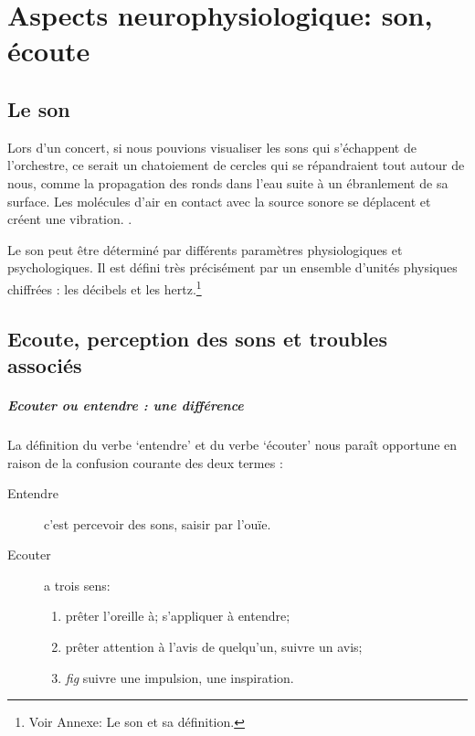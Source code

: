 
\chapter{Aspects neurophysiologique: son, écoute}


\section{Le son}

Lors d'un concert, si nous pouvions visualiser les sons qui
s'échappent de l'orchestre, ce serait un chatoiement de cercles qui se
répandraient tout autour de nous, comme 
la propagation des
ronds dans l'eau suite à un ébranlement de sa surface.
Les molécules d'air en contact avec la source sonore se déplacent et
créent une vibration. \autocite[p. 183]{bencivelli:pourquoi,}.


Le son peut être déterminé par différents paramètres
physiologiques et psychologiques.
Il est défini très précisément par un ensemble d'unités physiques chiffrées
: les décibels  et les hertz.\footnote{Voir Annexe: Le son et sa
  définition.}




\section{Ecoute, perception des sons et troubles associés}
\paragraph{Ecouter ou entendre : une différence}

La définition du verbe `entendre' et du verbe `écouter' 
\autocite[pp. 361--385]{hachette:dictionnaire} nous paraît opportune
en raison de la confusion courante des deux termes :
\begin{description}
\item[Entendre] c'est  percevoir des sons, saisir par l'ouïe.
\item[Ecouter] a trois sens: 
\begin{enumerate}
	\item prêter l'oreille à; s'appliquer à entendre;
	\item prêter attention à l'avis de quelqu'un, suivre un avis;
	\item \emph{fig} suivre une impulsion,	une inspiration.
\end{enumerate}
\end{description}


